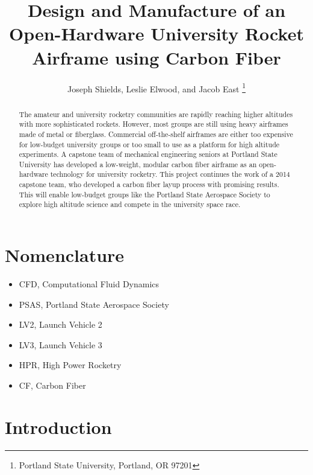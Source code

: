 \documentclass{aiaa-tc}%
\title{Design and Manufacture of an Open-Hardware 
 	University Rocket Airframe using Carbon Fiber}
\author{
Joseph Shields, Leslie Elwood, and Jacob East%
	\thanks{Portland State University, Portland, OR 97201}
 }
\begin{document}
\maketitle

\begin{abstract}
The amateur and university rocketry communities are rapidly reaching higher altitudes with more sophisticated rockets. However, most groups are still using heavy airframes made of metal or fiberglass. Commercial off-the-shelf airframes are either too expensive for low-budget university groups or too small to use as a platform for high altitude experiments. 
A capstone team of mechanical engineering seniors at Portland State University has developed a low-weight, modular carbon fiber airframe as an open-hardware technology for university rocketry. 
This project continues the work of a 2014 capstone team, who developed a carbon fiber layup process with promising results. 
This will enable low-budget groups like the Portland State Aerospace Society to explore high altitude science and compete in the university space race.  \end{abstract}
\section*{Nomenclature}
\begin{itemize}
	\item CFD, Computational Fluid Dynamics
	\item PSAS, Portland State Aerospace Society
	\item LV2, Launch Vehicle 2
	\item LV3, Launch Vehicle 3
	\item HPR, High Power Rocketry
	\item CF, Carbon Fiber
\end{itemize}


\section{Introduction}
\end{document}

